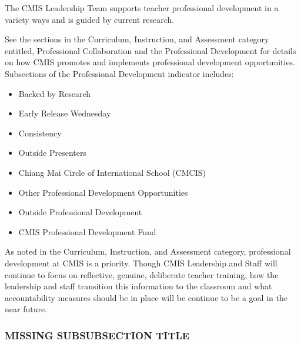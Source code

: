 \begin{findings}
The CMIS Leadership Team supports teacher professional development in a variety ways and is guided by current research. 

See the sections in the Curriculum, Instruction, and Assessment category entitled, Professional Collaboration and the Professional Development for details on how CMIS promotes and implements professional development opportunities. Subsections of the Professional Development indicator includes:

\begin{itemize}
\item Backed by Research
\item Early Release Wednesday
\item Consistency 
\item Outside Presenters
\item Chiang Mai Circle of International School (CMCIS) 
\item Other Professional Development Opportunities
\item Outside Professional Development 
\item CMIS Professional Development Fund 
\end{itemize}


As noted in the Curriculum, Instruction, and Assessment category, professional development at CMIS is a priority. Though CMIS Leadership and Staff will continue to focus on reflective, genuine, deliberate teacher training, how the leadership and staff transition this information to the classroom and what accountability measures should be in place will be continue to be a goal in the near future.
\end{findings}

\subsubsection{MISSING SUBSUBSECTION TITLE}



